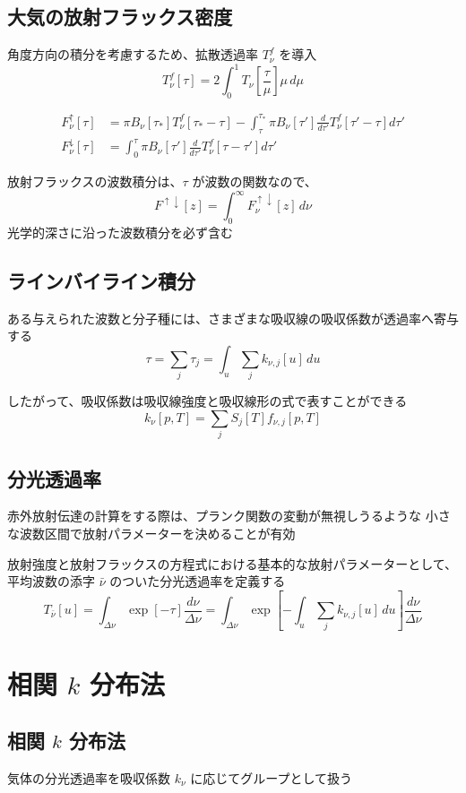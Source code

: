 \documentclass[article]{dennou777}
\begin{document}
\subsection{大気の放射フラックス密度}
角度方向の積分を考慮するため、拡散透過率 $T^f_\nu$ を導入
\[T^f_\nu[\tau]=2\int^1_0 T_\nu\left[\frac{\tau}{\mu}\right]\mu\,d\mu\]

\begin{align*}
	F^\uparrow_\nu[\tau]
		&=\pi B_\nu[\tau_*]T^f_\nu[\tau_*-\tau]
		-\int^{\tau_*}_\tau \pi B_\nu[\tau']\frac{d}{d\tau'}T^f_\nu[\tau'-\tau]d\tau'\\
	F^\downarrow_\nu[\tau]
		&=\int^\tau_0 \pi B_\nu[\tau']\frac{d}{d\tau'}T^f_\nu[\tau-\tau']d\tau'
\end{align*}

放射フラックスの波数積分は、$\tau$ が波数の関数なので、
\[F^{\uparrow\downarrow}[z]=\int^\infty_0 F^{\uparrow\downarrow}_\nu[z]\,d\nu\]
光学的深さに沿った波数積分を必ず含む

\subsection{ラインバイライン積分}
ある与えられた波数と分子種には、さまざまな吸収線の吸収係数が透過率へ寄与する
\[\tau=\sum_j \tau_j=\int_u\sum_j k_{\nu,j}[u]\,du\]

したがって、吸収係数は吸収線強度と吸収線形の式で表すことができる
\[k_\nu[p,T]=\sum_j S_j[T]f_{\nu,j}[p,T]\]

\subsection{分光透過率}
赤外放射伝達の計算をする際は、プランク関数の変動が無視しうるような
小さな波数区間で放射パラメーターを決めることが有効

放射強度と放射フラックスの方程式における基本的な放射パラメーターとして、
平均波数の添字 $\bar\nu$ のついた分光透過率を定義する
\[
	T_{\bar\nu}[u]
	=\int_{\Delta\nu}\exp[-\tau]\frac{d\nu}{\Delta\nu}
	=\int_{\Delta\nu}\exp\left[-\int_u\sum_j k_{\nu,j}[u]\,du\right]\frac{d\nu}{\Delta\nu}
\]

\section{相関 $k$ 分布法}

\subsection{相関 $k$ 分布法}
気体の分光透過率を吸収係数 $k_\nu$ に応じてグループとして扱う
\end{document}
